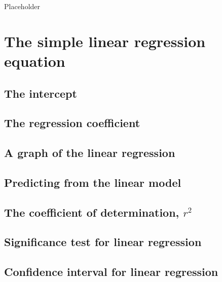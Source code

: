 \documentclass[english,10pt,a4paper,oneside]{book}
\begin{document}
Placeholder

\hypertarget{the-simple-linear-regression-equation}{%
\section{The simple linear regression equation}\label{the-simple-linear-regression-equation}}

\hypertarget{the-intercept}{%
\subsection{The intercept}\label{the-intercept}}

\hypertarget{the-regression-coefficient}{%
\subsection{The regression coefficient}\label{the-regression-coefficient}}

\hypertarget{a-graph-of-the-linear-regression}{%
\subsection{A graph of the linear regression}\label{a-graph-of-the-linear-regression}}

\hypertarget{predicting-from-the-linear-model}{%
\subsection{Predicting from the linear model}\label{predicting-from-the-linear-model}}

\hypertarget{the-coefficient-of-determination-r2}{%
\subsection{\texorpdfstring{The coefficient of determination, \(r^{2}\)}{The coefficient of determination, r\^{}\{2\}}}\label{the-coefficient-of-determination-r2}}

\hypertarget{significance-test-for-linear-regression}{%
\subsection{Significance test for linear regression}\label{significance-test-for-linear-regression}}

\hypertarget{confidence-interval-for-linear-regression}{%
\subsection{Confidence interval for linear regression}\label{confidence-interval-for-linear-regression}}
\end{document}
